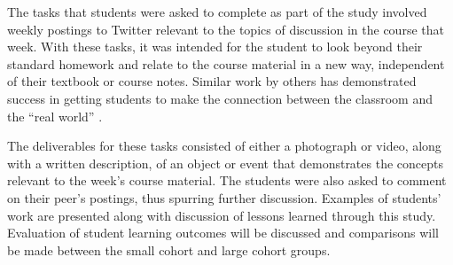 \documentclass[12pt]{article}
\begin{document}
The tasks that students were asked to complete as part of the study involved weekly postings to Twitter relevant to the topics of discussion in the course that week. With these tasks, it was intended for the student to look beyond their standard homework and relate to the course material in a new way, independent of their textbook or course notes. Similar work by others has demonstrated success in getting students to make the connection between the classroom and the “real world” \cite{hopp_journal_2008}.

The deliverables for these tasks consisted of either a photograph or video, along with a written description, of an object or event that demonstrates the concepts relevant to the week’s course material. The students were also asked to comment on their peer's postings, thus spurring further discussion. Examples of students’ work are presented along with discussion of lessons learned through this study. Evaluation of student learning outcomes will be discussed and comparisons will be made between the small cohort and large cohort groups.

\vspace{4\baselineskip}\vspace{-\parskip} %
\footnotesize %


\end{document}

